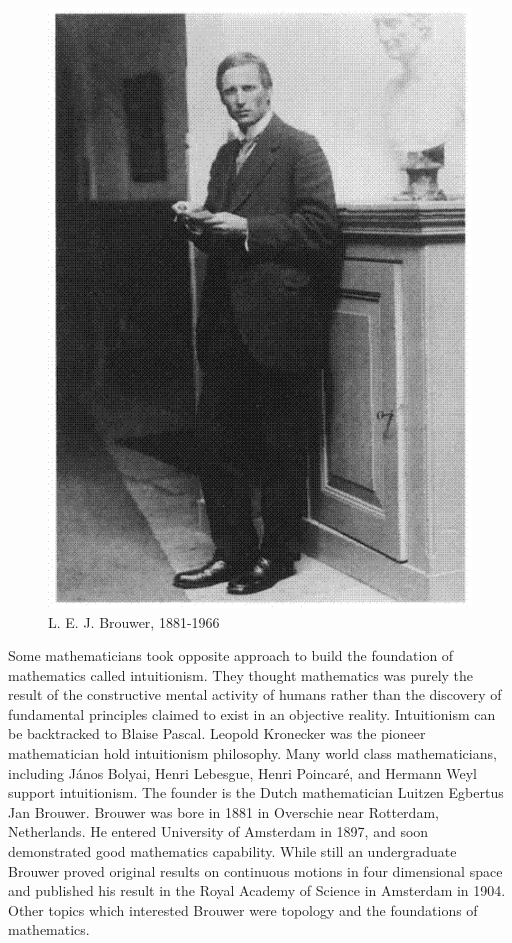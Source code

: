 \documentclass{article}
\begin{document}
\begin{figure}
 \centering
 \includegraphics[scale=0.28]{img/Brouwer.png}
 \captionsetup{labelformat=empty}
 \caption{L. E. J. Brouwer, 1881-1966}
 \label{fig:Brouwer}
\end{figure}

Some mathematicians took opposite approach to build the foundation of mathematics called intuitionism. They thought mathematics was purely the result of the constructive mental activity of humans rather than the discovery of fundamental principles claimed to exist in an objective reality. Intuitionism can be backtracked to Blaise Pascal. Leopold Kronecker was the pioneer mathematician hold intuitionism philosophy. Many world class mathematicians, including János Bolyai, Henri Lebesgue, Henri Poincaré, and Hermann Weyl support intuitionism. The founder is the Dutch mathematician Luitzen Egbertus Jan Brouwer. Brouwer was bore in 1881 in Overschie near Rotterdam, Netherlands. He entered University of Amsterdam in 1897, and soon demonstrated good mathematics capability. While still an undergraduate Brouwer proved original results on continuous motions in four dimensional space and published his result in the Royal Academy of Science in Amsterdam in 1904. Other topics which interested Brouwer were topology and the foundations of mathematics.
\end{document}
